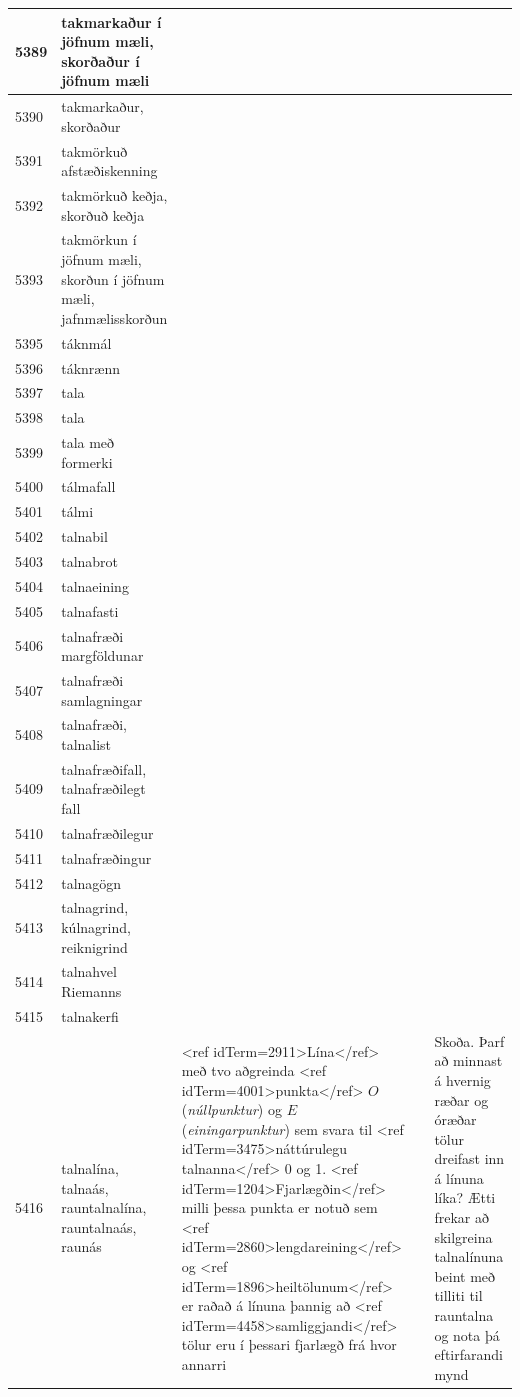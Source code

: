 \begin{longtable}{p{}|p{}|p{}|p{}|p{}}
\hline
5389 & takmarkaður í jöfnum mæli, skorðaður í jöfnum mæli &  &  &  \\
\hline
5390 & takmarkaður, skorðaður &  &  &  \\
\hline
5391 & takmörkuð afstæðiskenning &  &  &  \\
\hline
5392 & takmörkuð keðja, skorðuð keðja &  &  &  \\
\hline
5393 & takmörkun í jöfnum mæli, skorðun í jöfnum mæli, jafnmælisskorðun &  &  &  \\
\hline
5395 & táknmál &  &  &  \\
\hline
5396 & táknrænn &  &  &  \\
\hline
5397 & tala &  &  &  \\
\hline
5398 & tala &  &  &  \\
\hline
5399 & tala með formerki &  &  &  \\
\hline
5400 & tálmafall &  &  &  \\
\hline
5401 & tálmi &  &  &  \\
\hline
5402 & talnabil &  &  &  \\
\hline
5403 & talnabrot &  &  &  \\
\hline
5404 & talnaeining &  &  &  \\
\hline
5405 & talnafasti &  &  &  \\
\hline
5406 & talnafræði margföldunar &  &  &  \\
\hline
5407 & talnafræði samlagningar &  &  &  \\
\hline
5408 & talnafræði, talnalist &  &  &  \\
\hline
5409 & talnafræðifall, talnafræðilegt fall &  &  &  \\
\hline
5410 & talnafræðilegur &  &  &  \\
\hline
5411 & talnafræðingur &  &  &  \\
\hline
5412 & talnagögn &  &  &  \\
\hline
5413 & talnagrind, kúlnagrind, reiknigrind &  &  &  \\
\hline
5414 & talnahvel Riemanns &  &  &  \\
\hline
5415 & talnakerfi & &  &  \\
\hline
5416 & talnalína, talnaás, rauntalnalína, rauntalnaás, raunás & <ref idTerm=2911>Lína</ref> með tvo aðgreinda <ref idTerm=4001>punkta</ref> $O$ (\textit{núllpunktur}) og $E$ (\textit{einingarpunktur}) sem svara til <ref idTerm=3475>náttúrulegu talnanna</ref> 0 og 1. <ref idTerm=1204>Fjarlægðin</ref> milli þessa punkta er notuð sem <ref idTerm=2860>lengdareining</ref> og <ref idTerm=1896>heiltölunum</ref> er raðað á línuna þannig að <ref idTerm=4458>samliggjandi</ref> tölur eru í þessari fjarlægð frá hvor annarri &  & Skoða. Þarf að minnast á hvernig ræðar og óræðar tölur dreifast inn á línuna líka? Ætti frekar að skilgreina talnalínuna beint með tilliti til rauntalna og nota þá eftirfarandi mynd


\end{longtable}
